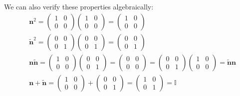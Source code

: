 \documentclass{book}
\theoremstyle{definition}
\newcommand{\Id}{\mathbb{I}}
\begin{document}
\begin{enumerate}[(a)]
	We can also verify these properties algebraically:
	\begin{align}
	&\mathbf{n}^2 = \begin{pmatrix}
	1&0\\0&0
	\end{pmatrix}\begin{pmatrix}
	1&0\\0&0
	\end{pmatrix} = \begin{pmatrix}
	1&0\\0&0
	\end{pmatrix}\\
	&\tilde{\mathbf{n}}^2 = \begin{pmatrix}
	0&0\\0&1
	\end{pmatrix}\begin{pmatrix}
	0&0\\0&1
	\end{pmatrix}=\begin{pmatrix}
	0&0\\0&1
	\end{pmatrix}\\
	&\mathbf{n}\tilde{\mathbf{n}}= \begin{pmatrix}
	1&0\\0&0
	\end{pmatrix}
	\begin{pmatrix}
	0&0\\0&1
	\end{pmatrix} = \begin{pmatrix}
	0&0\\0&0
	\end{pmatrix} = \begin{pmatrix}
	0&0\\0&1
	\end{pmatrix}\begin{pmatrix}
	1&0\\0&0
	\end{pmatrix} = \tilde{\mathbf{n}}\mathbf{n}\\
	&\mathbf{n} +  \tilde{\mathbf{n}}  = \begin{pmatrix}
	1&0\\0&0
	\end{pmatrix} + \begin{pmatrix}
	0&0\\0&1
	\end{pmatrix} = \begin{pmatrix}
	1&0\\0&1
	\end{pmatrix} = \Id
	\end{align} 
	

\end{enumerate}
\end{document}
